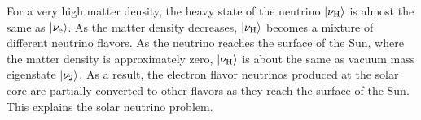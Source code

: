 For a very high matter density, the heavy state of the neutrino $\left| \nu_{\mathrm H}\right\rangle$ is almost the same as $\left| \nu_{\mathrm e}\right\rangle$. As the matter density decreases, $\left| \nu_{\mathrm H}\right\rangle$ becomes a mixture of different neutrino flavors. As the neutrino reaches the surface of the Sun, where the matter density is approximately zero, $\left| \nu_{\mathrm H}\right\rangle$ is about the same as vacuum mass eigenstate $\left| \nu_{2}\right\rangle$. As a result, the electron flavor neutrinos produced at the solar core are partially converted to other flavors as they reach the surface of the Sun. This explains the solar neutrino problem.

%


















